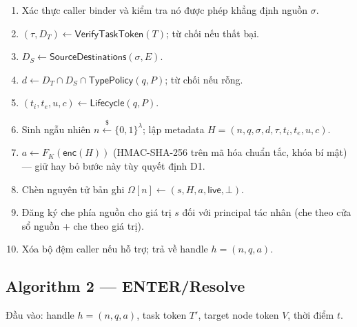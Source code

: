 \documentclass[11pt,a4paper]{article}
\newcommand{\sample}{\xleftarrow{\$}}
\begin{document}
\begin{enumerate}
  \item Xác thực caller binder và kiểm tra nó được phép khẳng định nguồn $\sigma$.
  \item $(\tau, D_T) \leftarrow \mathsf{VerifyTaskToken}(T)$; từ chối nếu thất bại.
  \item $D_S \leftarrow \mathsf{SourceDestinations}(\sigma, E)$.
  \item $d \leftarrow D_T \cap D_S \cap \mathsf{TypePolicy}(q, P)$; từ chối nếu rỗng.
  \item $(t_i, t_e, u, c) \leftarrow \mathsf{Lifecycle}(q, P)$.
  \item Sinh ngẫu nhiên $n \sample \{0,1\}^\lambda$; lập metadata
        $H = (n, q, \sigma, d, \tau, t_i, t_e, u, c)$.
  \item $a \leftarrow F_K(\mathsf{enc}(H))$ (HMAC-SHA-256 trên mã hóa chuẩn tắc, khóa bí mật) --- giữ hay bỏ bước này tùy quyết định D1.
  \item Chèn nguyên tử bản ghi $\Omega[n] \leftarrow (s, H, a, \mathsf{live}, \bot)$.
  \item Đăng ký che phía nguồn cho giá trị $s$ đối với principal tác nhân (che theo cửa sổ nguồn + che theo giá trị).
  \item Xóa bộ đệm caller nếu hỗ trợ; trả về handle $h = (n, q, a)$.
\end{enumerate}

\subsection{Algorithm 2 --- ENTER/Resolve}

Đầu vào: handle $h = (n, q, a)$, task token $T'$, target node token $V$, thời điểm $t$.
\end{document}
